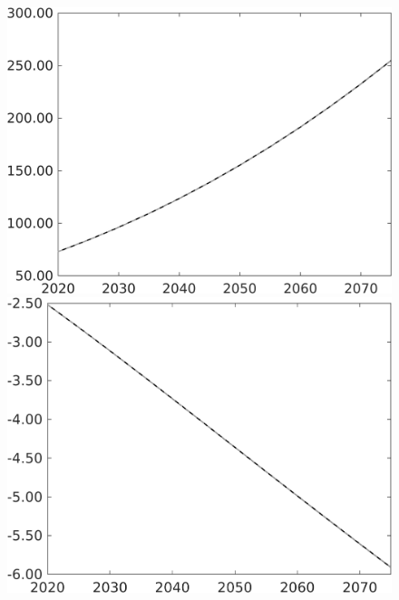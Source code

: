 \documentclass[12pt]{article}
\begin{document}
\begin{figure}[h!!]
\begin{minipage}[]{0.32\textwidth}
	\end{minipage}	
	\begin{minipage}[]{0.32\textwidth}
		\includegraphics[width=1\textwidth]{../../codding_model/own_basedOnFried/optimalPol_010922_revision/figures/all_13Sept22/PerdifNoTauf_regime0_CompTaul_pepn_spillover0_nsk0_xgr0_knspil1_sep1_LFlimit0_emsbase0_countec0_GovRev0_etaa0.79_lgd0.png}
	\end{minipage}	
	\begin{minipage}[]{0.32\textwidth}
		\includegraphics[width=1\textwidth]{../../codding_model/own_basedOnFried/optimalPol_010922_revision/figures/all_13Sept22/PerdifNoTauf_regime0_CompTaul_EY_spillover0_nsk0_xgr0_knspil1_sep1_LFlimit0_emsbase0_countec0_GovRev0_etaa0.79_lgd0.png}

\end{minipage}
\end{figure}
\end{document}
